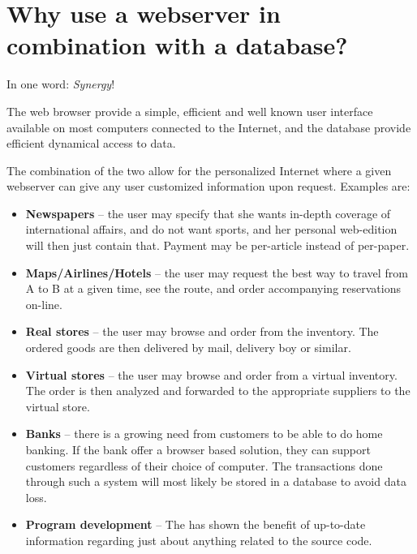 \section{Why use a webserver in combination with a database?}
\label{sec:why-use-a-webserver-in-combination-with-a-database}

In one word: \textit{Synergy}!


The web browser provide a simple, efficient and well known user
interface available on most computers connected to the Internet, and
the database provide efficient dynamical access to data.

The combination of the two allow for the personalized Internet where a
given webserver can give any user customized information upon request.
Examples are:

\begin{itemize}
\item \textbf{Newspapers} -- the user may specify that she wants
  in-depth coverage of international affairs, and do not want sports,
  and her personal web-edition will then just contain that.  Payment
  may be per-article instead of per-paper.
  
\item \textbf{Maps/Airlines/Hotels} -- the user may request the best
  way to travel from A to B at a given time, see the route, and order
  accompanying reservations on-line.

\item \textbf{Real stores} -- the user may browse and order from the inventory.
  The ordered goods are then delivered by mail, delivery boy or
  similar.
  
\item \textbf{Virtual stores} -- the user may browse and order from a
  virtual inventory.  The order is then analyzed and forwarded to the
  appropriate suppliers to the virtual store.
  
\item \textbf{Banks} -- there is a growing need from customers to be
  able to do home banking.  If the bank offer a browser based
  solution, they can support customers regardless of their choice of
  computer.  The transactions done through such a system will most
  likely be stored in a database to avoid data loss.
  
\item \textbf{Program development} -- The
   has shown the
  benefit of up-to-date information regarding just about anything
  related to the source code.

\end{itemize}


